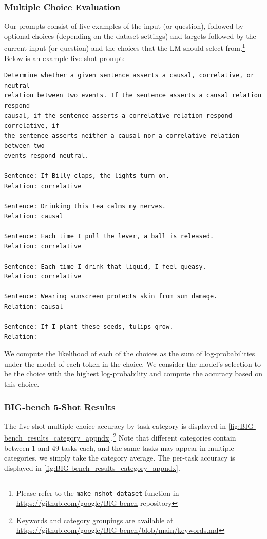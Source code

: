 \documentclass[11pt, a4paper, logo, internal, copyright, nonumbering]{deepmind}
\newcommand{\bigbench}{BIG-bench\xspace}
\begin{document}
\subsubsection{Multiple Choice Evaluation}\label{sec:bb:eval}
Our prompts consist of five examples of the input (or question), followed by optional choices (depending on the dataset settings) and targets followed by the current input (or question) and the choices that the LM should select from.\footnote{Please refer to the \texttt{make_nshot_dataset} function in \url{https://github.com/google/BIG-bench} repository}
Below is an example five-shot prompt:

{
\footnotesize
\begin{verbatim}
Determine whether a given sentence asserts a causal, correlative, or neutral
relation between two events. If the sentence asserts a causal relation respond
causal, if the sentence asserts a correlative relation respond correlative, if
the sentence asserts neither a causal nor a correlative relation between two
events respond neutral.

Sentence: If Billy claps, the lights turn on.
Relation: correlative

Sentence: Drinking this tea calms my nerves.
Relation: causal

Sentence: Each time I pull the lever, a ball is released.
Relation: correlative

Sentence: Each time I drink that liquid, I feel queasy.
Relation: correlative

Sentence: Wearing sunscreen protects skin from sun damage.
Relation: causal

Sentence: If I plant these seeds, tulips grow.
Relation: 
\end{verbatim}
}

We compute the likelihood of each of the choices as the sum of log-probabilities under the model of each token in the choice. We consider the model's selection to be the choice with the highest log-probability and compute the accuracy based on this choice. 

\subsubsection{\bigbench 5-Shot Results}\label{sec:bb:results}
The five-shot multiple-choice accuracy by task category is displayed in \autoref{fig:BIG-bench_results_category_appndx}.\footnote{Keywords and category groupings are available at \url{https://github.com/google/BIG-bench/blob/main/keywords.md}} Note that different categories contain between 1 and 49 tasks each, and the same tasks may appear in multiple categories, we simply take the category average. The per-task accuracy is displayed in \autoref{fig:BIG-bench_results_category_appndx}.
\end{document}
